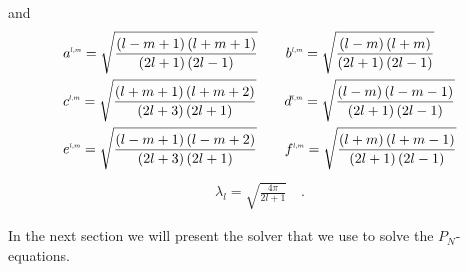 and
\begin{align*}
&
a^{\scaleto{l,m}{4pt}}= \sqrt{\frac{\left(l-m+1\right)\left(l+m+1\right)}{\left(2l+1\right)\left(2l-1\right)}} \qquad
b^{\scaleto{l,m}{4pt}}= \sqrt{\frac{\left(l-m\right)\left(l+m\right)}{\left(2l+1\right)\left(2l-1\right)}}
\\&
c^{\scaleto{l,m}{4pt}}= \sqrt{\frac{\left(l+m+1\right)\left(l+m+2\right)}{\left(2l+3\right)\left(2l+1\right)}} \qquad
d^{\scaleto{l,m}{4pt}}= \sqrt{\frac{\left(l-m\right)\left(l-m-1\right)}{\left(2l+1\right)\left(2l-1\right)}}
\\&
e^{\scaleto{l,m}{4pt}}= \sqrt{\frac{\left(l-m+1\right)\left(l-m+2\right)}{\left(2l+3\right)\left(2l+1\right)}} \qquad
f^{\scaleto{l,m}{4pt}}= \sqrt{\frac{\left(l+m\right)\left(l+m-1\right)}{\left(2l+1\right)\left(2l-1\right)}}
\end{align*}
\begin{align*}
\lambda_l=\sqrt{\frac{4\pi}{2l+1}}
\quad .
\end{align*}

In the next section we will present the solver that we use to solve the $P_N$-equations.
\vspace{1in}